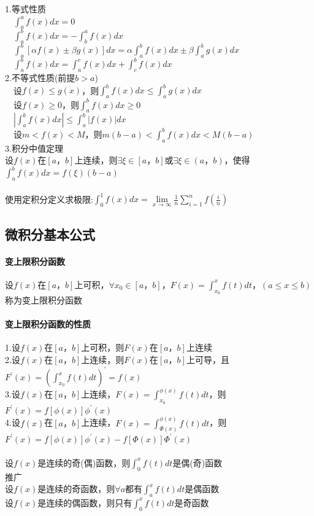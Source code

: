 \documentclass{article}
\begin{document}
\begin{flushleft}
	1.等式性质\\
	\ \ $\int_{a}^{a}f(x)dx=0$\\
	\ \ $\int_{a}^{b}f(x)dx=-\int_{b}^{a}f(x)dx$\\
	\ \ $\int_{a}^{b}[\alpha f(x)\pm \beta g(x)]dx=\alpha\int_{a}^{b}f(x)dx\pm \beta\int_{a}^{b}g(x)dx$\\
	\ \ $\int_{a}^{b}f(x)dx=\int_{a}^{c}f(x)dx+\int_{c}^{b}f(x)dx$\\
	2.不等式性质(前提$b>a$)\\
	\ \ 设$f(x)\le g(x)$，则$\int_{a}^{b}f(x)dx\le \int_{a}^{b}g(x)dx$\\
	\ \ 设$f(x)\ge 0$，则$\int_{a}^{b}f(x)dx \ge 0$\\
	\ \ $|\int_{a}^{b}f(x)dx| \le \int_{a}^{b}|f(x)|dx$\\
	\ \ 设$m<f(x)<M$，则$m(b-a)<\int_{a}^{b}f(x)dx<M(b-a)$\\
	3.积分中值定理\\
	设$f(x)$在$[a，b]$上连续，则$\exists \xi \in [a，b]$或$\exists \xi \in (a，b)$，使得$\int_{a}^{b}f(x)dx=f(\xi)(b-a)$\\
	~\\
	使用定积分定义求极限:$\int_{0}^{1}f(x)dx=\lim\limits_{x\to \infty}\frac{1}{n}\sum_{i=1}^{n}f(\frac{i}{n})$\\
	
	\subsection{微积分基本公式}
	
	\paragraph{变上限积分函数}
	设$f(x)$在$[a，b]$上可积，$\forall x_0\in [a，b]$，$F(x)=\int_{x_0}^{x}f(t)dt，(a\le x\le b)$称为变上限积分函数\\
	\paragraph{变上限积分函数的性质}
	1.设$f(x)$在$[a，b]$上可积，则$F(x)$在$[a，b]$上连续\\
	2.设$f(x)$在$[a，b]$上连续，则$F(x)$在$[a，b]$上可导，且$F^{'}(x)=(\int_{x_0}^{x}f(t)dt)^{'}=f(x)$\\
	3.设$f(x)$在$[a，b]$上连续，$F(x)=\int_{x_0}^{\phi(x)}f(t)dt$，则$F^{'}(x)=f[\phi(x)]\phi^{'}(x)$\\
	4.设$f(x)$在$[a，b]$上连续，$F(x)=\int_{\Phi(x)}^{\phi(x)}f(t)dt$，则$F^{'}(x)=f[\phi(x)]\phi^{'}(x)-f[\Phi(x)]\Phi^{'}(x)$\\
	~\\
	设$f(x)$是连续的奇(偶)函数，则$\int_{0}^{x}f(t)dt$是偶(奇)函数\\
	推广\\
	设$f(x)$是连续的奇函数，则$\forall a$都有$\int_{a}^{x}f(t)dt$是偶函数\\
	设$f(x)$是连续的偶函数，则只有$\int_{0}^{x}f(t)dt$是奇函数\\

\end{flushleft}
\end{document}
